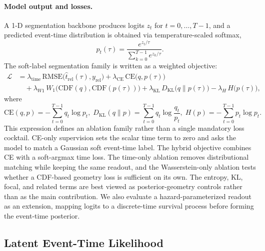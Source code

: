 \documentclass[12pt]{article}
\begin{document}
\paragraph{Model output and losses.}
A 1-D segmentation backbone produces logits $z_t$ for $t=0,\dots,T-1$, and a predicted
event-time distribution is obtained via temperature-scaled softmax,
\begin{equation}
\label{eq:rt_pred_dist}
p_t(\tau)=\frac{e^{z_t/\tau}}{\sum_{k=0}^{T-1} e^{z_k/\tau}}.
\end{equation}
The soft-label segmentation family is written as a weighted objective:
\begin{equation}
\label{eq:rt_loss}
\begin{aligned}
\mathcal{L}
&= \lambda_{\text{time}}\,\mathrm{RMSE}\big(\hat t_{\mathrm{rel}}(\tau), y_{\mathrm{rel}}\big)
 + \lambda_{\text{CE}}\,\mathrm{CE}\big(q, p(\tau)\big) \\
&\quad + \lambda_{W1}\,W_1\big(\mathrm{CDF}(q), \mathrm{CDF}(p(\tau))\big)
 + \lambda_{\text{KL}}\,D_{\mathrm{KL}}\big(q\|p(\tau)\big)
 - \lambda_{H}\,H\big(p(\tau)\big),
\end{aligned}
\end{equation}
where  
\begin{equation*}
\mathrm{CE}(q,p)=-\sum_{t=0}^{T-1} q_t \log p_t, \;
D_{\mathrm{KL}}(q\|p)=\sum_{t=0}^{T-1} q_t \log\frac{q_t}{p_t}, \;
H(p)=-\sum_{t=0}^{T-1} p_t \log p_t.
\end{equation*}
This expression defines an ablation family rather than a single mandatory loss cocktail. CE-only supervision sets the scalar time term to zero and asks the model to match a Gaussian soft event-time label. The hybrid objective combines CE with a soft-argmax time loss. The time-only ablation removes distributional matching while keeping the same readout, and the Wasserstein-only ablation tests whether a CDF-based geometry loss is sufficient on its own. The entropy, KL, focal, and related terms are best viewed as posterior-geometry controls rather than as the main contribution. We also evaluate a hazard-parameterized readout as an extension, mapping logits to a discrete-time survival process before forming the event-time posterior.

\subsection{Latent Event-Time Likelihood}
\end{document}
